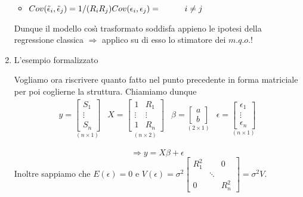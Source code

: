\documentclass[a4paper]{report}
\newcounter{ese}
\theoremstyle{remark}
\begin{document}
\begin{enumerate}
\begin{itemize}
\item $Cov(\tilde{\epsilon}_{i},\tilde{\epsilon}_{j})=1/(R_{i}R_{j})Cov(%
\epsilon _{i},\epsilon _{j})=\hspace*{1cm}i\neq j$
\end{itemize}

Dunque il modello cos\`{\i} trasformato soddisfa appieno le ipotesi della
regressione classica $\Rightarrow $ applico su di esso lo stimatore dei $%
m.q.o.$!

\item L'esempio formalizzato

Vogliamo ora riscrivere quanto fatto nel punto precedente in forma
matriciale per poi coglierne la struttura. Chiamiamo dunque 
\begin{equation*}
\begin{array}{cccc}
y=\underset{(n\times 1)}{\left[ 
\begin{array}{c}
S_{1} \\ 
\vdots \\ 
S_{n}%
\end{array}%
\right] } & X=\underset{(n\times 2)}{\left[ 
\begin{array}{cc}
1 & R_{1} \\ 
\vdots & \vdots \\ 
1 & R_{n}%
\end{array}%
\right] } & \beta =\underset{(2\times 1)}{\left[ 
\begin{array}{c}
a \\ 
b%
\end{array}%
\right] } & \epsilon =\underset{(n\times 1)}{\left[ 
\begin{array}{c}
\epsilon _{1} \\ 
\vdots \\ 
\epsilon _{n}%
\end{array}%
\right] }%
\end{array}%
\end{equation*}

\begin{equation*}
\Rightarrow y=X\beta +\epsilon
\end{equation*}%
Inoltre sappiamo che $E(\epsilon )=0$ e $V(\epsilon )=\sigma ^{2}\left[ 
\begin{array}{ccc}
R_{1}^{2} &  & 0 \\ 
& \ddots &  \\ 
0 &  & R_{n}^{2}%
\end{array}%
\right] =\sigma ^{2}V$.


\end{enumerate}
\end{document}
